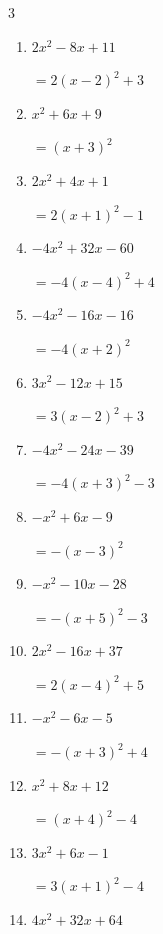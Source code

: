 \begin{multicols}{3}
\begin{enumerate}
        $=\left( x-5\right)^{2}-4$

  \item $2x^{2}-8x+11$

        $=2\left( x-2\right)^{2}+3$

  \item $x^{2}+6x+9$

        $=\left( x+3\right)^{2}$

\columnbreak %

  \item $2x^{2}+4x+1$

        $=2\left( x+1\right)^{2}-1$

  \item $-4x^{2}+32x-60$

        $=-4\left( x-4\right)^{2}+4$

  \item $-4x^{2}-16x-16$

        $=-4\left( x+2\right)^{2}$

  \item $3x^{2}-12x+15$

        $=3\left( x-2\right)^{2}+3$

  \item $-4x^{2}-24x-39$

        $=-4\left( x+3\right)^{2}-3$

  \item $-x^{2}+6x-9$

        $=-\left( x-3\right)^{2}$

  \item $-x^{2}-10x-28$

        $=-\left( x+5\right)^{2}-3$

  \item $2x^{2}-16x+37$

        $=2\left( x-4\right)^{2}+5$

  \item $-x^{2}-6x-5$

        $=-\left( x+3\right)^{2}+4$

  \item $x^{2}+8x+12$

        $=\left( x+4\right)^{2}-4$

\columnbreak %

  \item $3x^{2}+6x-1$

        $=3\left( x+1\right)^{2}-4$

  \item $4x^{2}+32x+64$


\end{enumerate}
\end{multicols}
